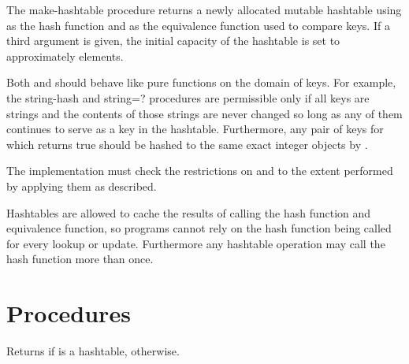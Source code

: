 \begin{entry}{%
}

The {\cf make-hashtable} procedure returns a newly allocated mutable
hashtable using  
as the hash function and  as the equivalence function used to 
compare keys.
If a third argument is given, the 
initial capacity of the hashtable is set to approximately  elements.

Both  and  should behave like pure functions
on the domain of keys.  For example, the {\cf string-hash}
and {\cf string=?} procedures are permissible only if all
keys are strings and the contents of those strings are never
changed so long as any of them continues to serve as a key in
the hashtable.  Furthermore, any pair of keys for which
 returns true should
be hashed to the same exact integer objects by 
.

\implresp The implementation must check the restrictions on
 and  to the extent performed by
applying them as described.

\begin{note}
Hashtables are allowed to cache the results of calling the
hash function and equivalence function, so programs cannot
rely on the hash function being called for every lookup or
update.  Furthermore any hashtable operation may call the
hash function more than once.
\end{note}

\end{entry}

\section{Procedures}

\begin{entry}{%
}

Returns \schtrue{} if  is a hashtable,
\schfalse{} otherwise.
\end{entry}

